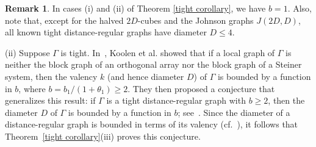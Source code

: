 \documentclass[11pt]{article}
\theoremstyle{definition}
\newtheorem{rema}[theo]{Remark}
\numberwithin{equation}{section}
\numberwithin{equation}{section}
\begin{document}
\begin{rema}
 In cases (i) and (ii) of Theorem \ref{tight corollary}, we have $b = 1$. Also, note that, except for the halved $2D$-cubes and the Johnson graphs $J(2D, D)$, all known tight distance-regular graphs have diameter $D \leqslant 4$.
 
(ii) Suppose $\Gamma$ is tight. 
In~\cite[Theorem 1.3]{KLLLLT2023+}, Koolen et al. showed that if a local graph of $\Gamma$ is neither the block graph of an orthogonal array nor the block graph of a Steiner system, then the valency $k$ (and hence diameter $D$) of $\Gamma$ is bounded by a function in $b$, where $b=b_1/(1+\theta_1) \geqslant 2$. 
They then proposed a conjecture that generalizes this result: if $\Gamma$ is a tight distance-regular graph with $b \geqslant 2$, then the diameter $D$ of $\Gamma$ is bounded by a function in $b$; see~\cite[Conjecture 28]{KLLLLT2023+}. 
Since the diameter of a distance-regular graph is bounded in terms of its valency (cf.~\cite[Section~4]{BDKM}), it follows that Theorem~\ref{tight corollary}(iii) proves this conjecture.
\end{rema}
\end{document}
